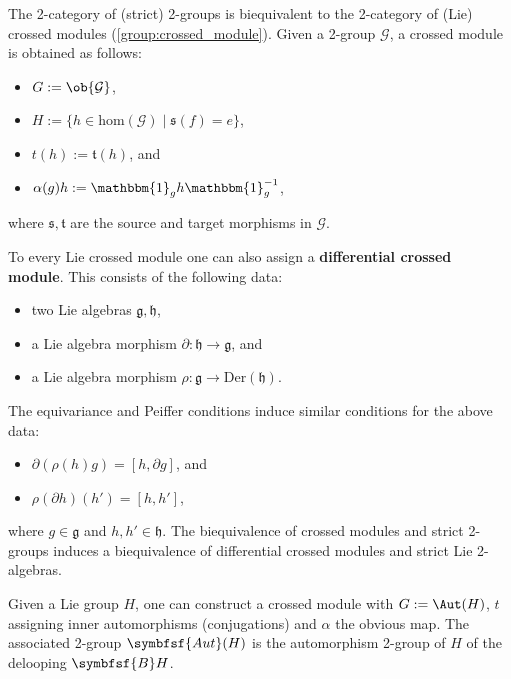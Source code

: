     \begin{property}
        The 2-category of (strict) 2-groups is biequivalent to the 2-category of (Lie) crossed modules (\cref{group:crossed_module}). Given a 2-group $\mathcal{G}$, a crossed module is obtained as follows:
        \begin{itemize}
            \item $G:=\ob{\mathcal{G}}$,
            \item $H:=\{h\in\mathrm{hom}(\mathcal{G})\mid\mathfrak{s}(f)=e\}$,
            \item $t(h):=\mathfrak{t}(h)$, and
            \item $\alpha(g)h := \mathbbm{1}_gh\mathbbm{1}_g^{-1}$,
        \end{itemize}
        where $\mathfrak{s},\mathfrak{t}$ are the source and target morphisms in $\mathcal{G}$.

        To every Lie crossed module one can also assign a \textbf{differential crossed module}. This consists of the following data:
        \begin{itemize}
            \item two Lie algebras $\mathfrak{g},\mathfrak{h}$,
            \item a Lie algebra morphism $\partial:\mathfrak{h}\rightarrow\mathfrak{g}$, and
            \item a Lie algebra morphism $\rho:\mathfrak{g}\rightarrow\text{Der}(\mathfrak{h})$.
        \end{itemize}
        The equivariance and Peiffer conditions induce similar conditions for the above data:
        \begin{itemize}
            \item $\partial(\rho(h)g) = [h,\partial g]$, and
            \item $\rho(\partial h)(h') = [h,h']$,
        \end{itemize}
        where $g\in\mathfrak{g}$ and $h,h'\in\mathfrak{h}$. The biequivalence of crossed modules and strict 2-groups induces a biequivalence of differential crossed modules and strict Lie 2-algebras.
    \end{property}

    \begin{example}
        Given a Lie group $H$, one can construct a crossed module with $G:=\Aut(H)$, $t$ assigning inner automorphisms (conjugations) and $\alpha$ the obvious map. The associated 2-group $\symbfsf{Aut}(H)$ is the automorphism 2-group of $H$ of the delooping $\symbfsf{B}H$.
    \end{example}

